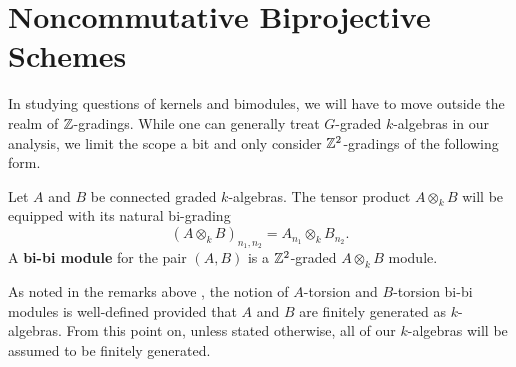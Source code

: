 \section{Noncommutative Biprojective Schemes}
In studying questions of kernels and bimodules, we will have to move outside the realm of \(\mathbb{Z}\)-gradings. While one can generally treat \(G\)-graded \(k\)-algebras in our analysis, we limit the scope a bit and only consider \(\mathbb{Z}^2\)-gradings of the following form.

\begin{definition}
  Let \(A\) and \(B\) be connected graded \(k\)-algebras. The tensor product \(A \otimes_k B\) will be equipped with its natural bi-grading 
  \begin{displaymath}
    (A \otimes_k B)_{n_1,n_2} = A_{n_1} \otimes_k B_{n_2}. 
  \end{displaymath}
  A \textbf{bi-bi module} for the pair \((A,B)\) is a \(\mathbb{Z}^2\)-graded \(A \otimes_k B\) module. 
\end{definition}

\begin{remark}
  As noted in the remarks above \parencite[Lemma 4.1]{VdB}, the notion of \(A\)-torsion and \(B\)-torsion bi-bi modules is well-defined provided that \(A\) and \(B\) are finitely generated as \(k\)-algebras.
  From this point on, unless stated otherwise, all of our \(k\)-algebras will be assumed to be finitely generated.
\end{remark}



